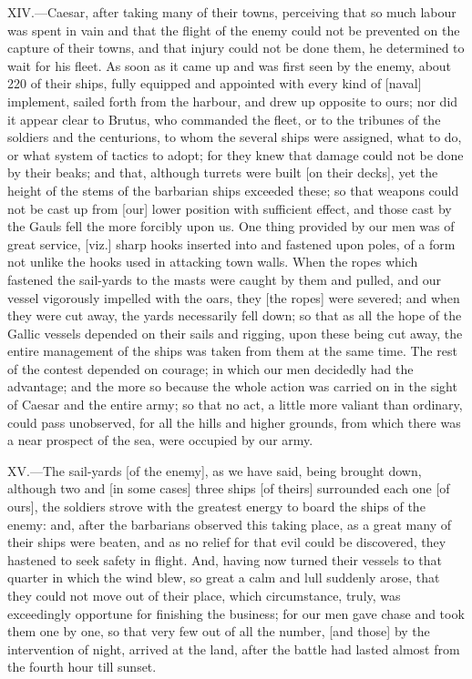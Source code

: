 XIV.—Caesar, after taking many of their towns, perceiving that so much
labour was spent in vain and that the flight of the enemy could not be
prevented on the capture of their towns, and that injury could not be
done them, he determined to wait for his fleet. As soon as it came up
and was first seen by the enemy, about 220 of their ships, fully
equipped and appointed with every kind of [naval] implement, sailed
forth from the harbour, and drew up opposite to ours; nor did it appear
clear to Brutus, who commanded the fleet, or to the tribunes of the
soldiers and the centurions, to whom the several ships were assigned,
what to do, or what system of tactics to adopt; for they knew that
damage could not be done by their beaks; and that, although turrets were
built [on their decks], yet the height of the stems of the barbarian
ships exceeded these; so that weapons could not be cast up from [our]
lower position with sufficient effect, and those cast by the Gauls fell
the more forcibly upon us. One thing provided by our men was of great
service, [viz.] sharp hooks inserted into and fastened upon poles, of a
form not unlike the hooks used in attacking town walls. When the ropes
which fastened the sail-yards to the masts were caught by them and
pulled, and our vessel vigorously impelled with the oars, they [the
ropes] were severed; and when they were cut away, the yards necessarily
fell down; so that as all the hope of the Gallic vessels depended on
their sails and rigging, upon these being cut away, the entire
management of the ships was taken from them at the same time. The rest
of the contest depended on courage; in which our men decidedly had the
advantage; and the more so because the whole action was carried on in
the sight of Caesar and the entire army; so that no act, a little more
valiant than ordinary, could pass unobserved, for all the hills and
higher grounds, from which there was a near prospect of the sea, were
occupied by our army.

XV.—The sail-yards [of the enemy], as we have said, being brought down,
although two and [in some cases] three ships [of theirs] surrounded each
one [of ours], the soldiers strove with the greatest energy to board the
ships of the enemy: and, after the barbarians observed this taking
place, as a great many of their ships were beaten, and as no relief for
that evil could be discovered, they hastened to seek safety in flight.
And, having now turned their vessels to that quarter in which the wind
blew, so great a calm and lull suddenly arose, that they could not move
out of their place, which circumstance, truly, was exceedingly opportune
for finishing the business; for our men gave chase and took them one by
one, so that very few out of all the number, [and those] by the
intervention of night, arrived at the land, after the battle had lasted
almost from the fourth hour till sunset.

